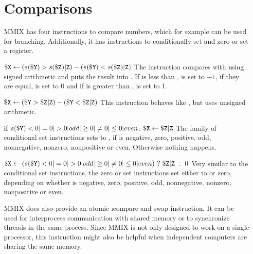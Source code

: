 \section{Comparisons}

MMIX has four instructions to compare numbers, which for example can be used for branching. Additionally, it has instructions to conditionally set and zero or set a register.

\instrtbl
	{}
	{${\tt \$X} \leftarrow (s({\tt \$Y}) > s({\tt \$Z}){\tt|Z}) - (s({\tt \$Y}) < s({\tt \$Z}){\tt|Z})$}
\noindent The instruction  compares  with  using signed arithmetic and puts the result into . If  is less than ,  is set to $-1$, if they are equal,  is set to 0 and if  is greater than ,  is set to 1. \citep[pg. 11]{mmix-doc}

\instrtbl
	{}
	{${\tt \$X} \leftarrow ({\tt \$Y} > {\tt \$Z}{\tt|Z}) - ({\tt \$Y} < {\tt \$Z}{\tt|Z})$}
\noindent This instruction behaves like , but uses unsigned arithmetic. \citep[pg. 11]{mmix-doc}

\instrtbl
	{}
	{if $s(\dr{Y}) <0|=0|>0|odd|\ge0|\ne0|\le0|even$: ${\tt \$X} \leftarrow {\tt \$Z}{\tt|Z}$}
\noindent The family of conditional set instructions sets  to , if  is negative, zero, positive, odd, nonnegative, nonzero, nonpositive or even. Otherwise nothing happens. \citep[pg. 11]{mmix-doc}

\instrtbl
	{}
	{$\dr{X} \leftarrow (s(\dr{Y}) <0|=0|>0|odd|\ge0|\ne0|\le0|even)~?~\udrim{Z}~:~0$}
\noindent Very similar to the conditional set instructions, the zero or set instructions set  either to  or zero, depending on whether  is negative, zero, positive, odd, nonnegative, nonzero, nonpositive or even. \citep[pg. 11]{mmix-doc}

\medskip

MMIX does also provide an atomic \i{compare and swap} instruction. It can be used for interprocess communication with shared memory or to synchronize threads in the same process. Since MMIX is not only designed to work on a single processor, this instruction might also be helpful when independent computers are sharing the same memory. \citep[pg. 25]{mmix-doc}

